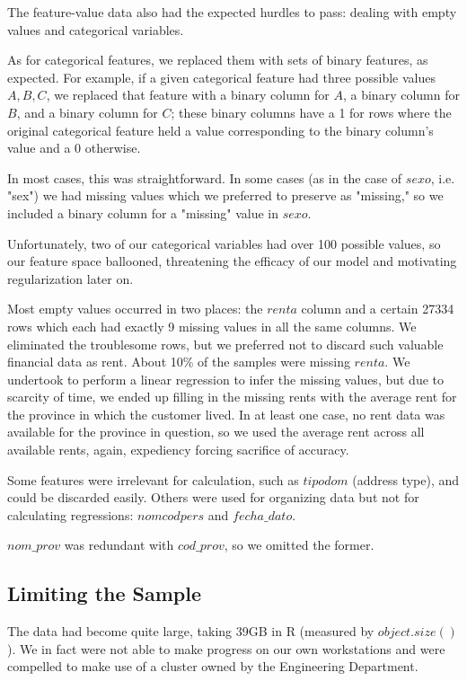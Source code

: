 \documentclass{article}
\begin{document}
\begin{spacing}{1}
\begin{large}
The feature-value data also had the expected hurdles to pass: dealing with empty values and categorical variables.

As for categorical features, we replaced them with sets of binary features, as expected. For example, if a given categorical feature had three possible values ${A,B,C}$, we replaced that feature with a binary column for $A$, a binary column for $B$, and a binary column for $C$; these binary columns have a 1 for rows where the original categorical feature held a value corresponding to the binary column's value and a 0 otherwise.

In most cases, this was straightforward. In some cases (as in the case of $sexo$, i.e. "sex") we had missing values which we preferred to preserve as "missing," so we included a binary column for a "missing" value in $sexo$.

Unfortunately, two of our categorical variables had over 100 possible values, so our feature space ballooned, threatening the efficacy of our model and motivating regularization later on.

Most empty values occurred in two places: the $renta$ column and a certain 27334 rows which each had exactly 9 missing values in all the same columns. We eliminated the troublesome rows, but we preferred not to discard such valuable financial data as rent. About 10\% of the samples were missing $renta$. We undertook to perform a linear regression to infer the missing values, but due to scarcity of time, we ended up filling in the missing rents with the average rent for the province in which the customer lived. In at least one case, no rent data was available for the province in question, so we used the average rent across all available rents, again, expediency forcing sacrifice of accuracy.

Some features were irrelevant for calculation, such as $tipodom$ (address type), and could be discarded easily. Others were used for organizing data but not for calculating regressions: $nomcodpers$ and $fecha\_dato$.

$nom\_prov$ was redundant with $cod\_prov$, so we omitted the former.

\subsection{Limiting the Sample}

The data had become quite large, taking 39GB in R (measured by $object.size()$). We in fact were not able to make progress on our own workstations and were compelled to make use of a cluster owned by the Engineering Department.


\end{large}
\end{spacing}
\end{document}
